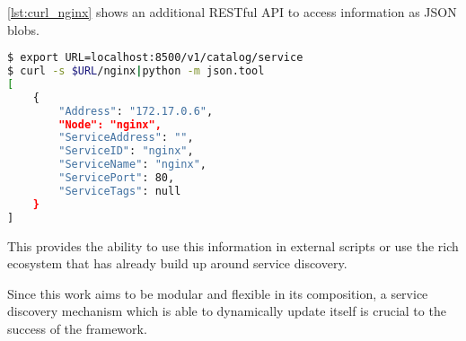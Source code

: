 \autoref{lst:curl_nginx} shows an additional RESTful API to access information as JSON blobs.

\begin{lstlisting}[language=bash,
    caption={Exposure of services via RESTful API.},
    label={lst:curl_nginx}]
$ export URL=localhost:8500/v1/catalog/service
$ curl -s $URL/nginx|python -m json.tool
[
    {
        "Address": "172.17.0.6",
        "Node": "nginx",
        "ServiceAddress": "",
        "ServiceID": "nginx",
        "ServiceName": "nginx",
        "ServicePort": 80,
        "ServiceTags": null
    }
]
\end{lstlisting}
This provides the ability to use this information in external scripts or use the rich ecosystem that has already build up around service discovery.

Since this work aims to be modular and flexible in its composition, a service discovery mechanism which is able to dynamically update itself is crucial to the success of the framework.
